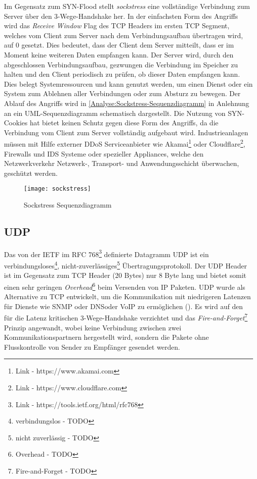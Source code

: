 Im Gegensatz zum SYN-Flood stellt \textit{sockstress} eine vollständige Verbindung zum Server über den 3-Wege-Handshake her. In der einfachsten Form des Angriffs wird das \textit{Receive Window} Flag des \ac{TCP} Headers im ersten \ac{TCP} Segment, welches vom Client zum Server nach dem Verbindungsaufbau übertragen wird, auf 0 gesetzt. Dies bedeutet, dass der Client dem Server mitteilt, dass er im Moment keine weiteren Daten empfangen kann. Der Server wird, durch den abgeschlossen Verbindungsaufbau, gezwungen die Verbindung im Speicher zu halten und den Client periodisch zu prüfen, ob dieser Daten empfangen kann. Dies belegt Systemressourcen und kann genutzt werden, um einen Dienst oder ein System zum Ablehnen aller Verbindungen oder zum Absturz zu bewegen. Der Ablauf des Angriffs wird in \autoref{Analyse:Sockstress-Sequenzdiagramm} in Anlehnung an ein \ac{UML}-Sequenzdiagramm schematisch dargestellt. Die Nutzung von SYN-Cookies hat bietet keinen Schutz gegen diese Form des Angriffs, da die Verbindung vom Client zum Server vollständig aufgebaut wird. Industrieanlagen müssen mit Hilfe externer \ac{DDoS} Serviceanbieter wie Akamai\footnote{Link - https://www.akamai.com} oder Cloudflare\footnote{Link - https://www.cloudflare.com}, Firewalls und \ac{IDS} Systeme oder spezieller Appliances, welche den Netzwerkverkehr Netzwerk-, Transport- und Anwendungsschicht überwachen, geschützt werden.

\begin{figure}[h]
  \centering
  \texttt{[image: sockstress]}
  \caption{Sockstress Sequenzdiagramm}
  \label{Analyse:Sockstress-Sequenzdiagramm}
\end{figure}

\clearpage

\subsection{\ac{UDP}}
Das von der \ac{IETF} im \ac{RFC} 768\footnote{Link - https://tools.ietf.org/html/rfc768} definierte Datagramm \ac{UDP} ist ein verbindungsloses\footnote{verbindungslos - TODO}, nicht-zuverlässiges\footnote{nicht zuverlässig - TODO} Übertragungsprotokoll. Der \ac{UDP} Header ist im Gegensatz zum \ac{TCP} Header (20 Bytes) nur 8 Byte lang und bietet somit einen sehr geringen \textit{Overhead}\footnote{Overhead - TODO} beim Versenden von \ac{IP} Paketen. \ac{UDP} wurde als Alternative zu \ac{TCP} entwickelt, um die Kommunikation mit niedrigeren Latenzen für Dienste wie \ac{SNMP} oder \ac{DNS}oder \ac{VoIP} zu ermöglichen (\cite{UDP2003}). Es wird auf den für die Latenz kritischen 3-Wege-Handshake verzichtet und das \textit{Fire-and-Forget}\footnote{Fire-and-Forget - TODO} Prinzip angewandt, wobei keine Verbindung zwischen zwei Kommunikationspartnern hergestellt wird, sondern die Pakete ohne Flusskontrolle von Sender zu Empfänger gesendet werden.

